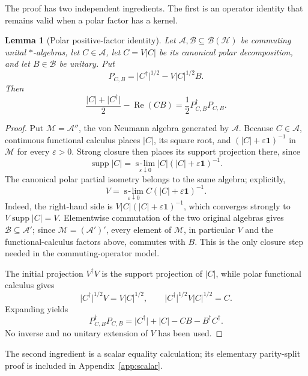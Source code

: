 \documentclass[11pt]{article}
\newtheorem{lemma}[theorem]{Lemma}
\theoremstyle{definition}
\theoremstyle{remark}
\newcommand{\Id}{\mathbf 1}
\newcommand{\cH}{\mathcal H}
\newcommand{\Reop}{\operatorname{Re}}
\newcommand{\supp}{\operatorname{supp}}
\newcommand{\absop}[1]{\lvert #1\rvert}
\begin{document}
The proof has two independent ingredients.  The first is an operator identity
that remains valid when a polar factor has a kernel.

\begin{lemma}[Polar positive-factor identity]
\label{lem:polar}
Let \(\mathcal A,\mathcal B\subseteq\mathcal B(\cH)\) be commuting unital
\(*\)-algebras, let \(C\in\mathcal A\), let
\(C=V\absop C\) be its canonical polar decomposition, and let
\(B\in\mathcal B\) be unitary.  Put
\[
 P_{C,B}=\absop{C^\dagger}^{1/2}-V\absop C^{1/2}B.
\]
Then
\begin{equation}
 \frac{\absop C+\absop{C^\dagger}}2-\Reop(CB)
 =\frac12P_{C,B}^\dagger P_{C,B}.
 \label{eq:polar-factor}
\end{equation}
\end{lemma}

\begin{proof}
Put \(\mathcal M=\mathcal A''\), the von Neumann algebra generated by
\(\mathcal A\).  Because \(C\in\mathcal A\), continuous functional
calculus places \(\absop C\), its square root, and
\((\absop C+\varepsilon\Id)^{-1}\) in \(\mathcal M\) for every
\(\varepsilon>0\).  Strong closure then places its support projection there,
since
\[
 \supp\absop C
 =\operatorname*{s\!-\!lim}_{\varepsilon\downarrow0}
 \absop C(\absop C+\varepsilon\Id)^{-1}.
\]
The canonical polar partial isometry belongs to the same algebra; explicitly,
\[
 V=\operatorname*{s\!-\!lim}_{\varepsilon\downarrow0}
 C(\absop C+\varepsilon\Id)^{-1}.
\]
Indeed, the right-hand side is
\(V\absop C(\absop C+\varepsilon\Id)^{-1}\), which converges strongly to
\(V\supp\absop C=V\).  Elementwise commutation of the two original
algebras gives \(\mathcal B\subseteq\mathcal A'\); since
\(\mathcal M=(\mathcal A')'\), every element of \(\mathcal M\), in
particular \(V\) and the functional-calculus factors above, commutes with
\(B\).  This is the only closure step needed in the commuting-operator
model.

The initial projection \(V^\dagger V\) is the support projection of
\(\absop C\), while polar functional calculus gives
\[
 \absop{C^\dagger}^{1/2}V=V\absop C^{1/2},
 \qquad
 \absop{C^\dagger}^{1/2}V\absop C^{1/2}=C.
\]
Expanding yields
\[
 P_{C,B}^\dagger P_{C,B}
 =\absop{C^\dagger}+\absop C-CB-B^\dagger C^\dagger.
\]
No inverse and no unitary extension of \(V\) has been used.
\end{proof}

The second ingredient is a scalar equality calculation; its elementary
parity-split proof is included in Appendix~\ref{app:scalar}.
\end{document}
